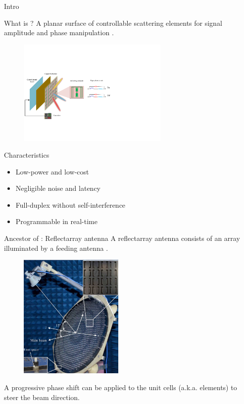 \documentclass[presentation,xcolor={table},9pt]{beamer}
\begin{document}
\begin{section}{Intro}
	\begin{frame}{What is ?}
		A planar surface of controllable scattering elements for signal amplitude and phase manipulation \cite{Wu2020}.
		\begin{figure}
			\centering
			\includegraphics[width=0.65\textwidth]{../assets/viva/ris_architecture.pdf}
			\label{fg:ris_architecture}
		\end{figure}
		\begin{block}{Characteristics}
			\begin{itemize}
				\item Low-power and low-cost
				\item Negligible noise and latency
				\item Full-duplex without self-interference
				\item Programmable in real-time
			\end{itemize}
		\end{block}
	\end{frame}

	\begin{frame}{Ancestor of : Reflectarray antenna}
		A reflectarray antenna consists of an array illuminated by a feeding antenna \cite{Deng2016}.
		\begin{figure}
			\centering
			\includegraphics[width=0.45\textwidth]{../assets/viva/reflectarray.png}
		\end{figure}
		A progressive phase shift can be applied to the unit cells (a.k.a. elements) to steer the beam direction.
	\end{frame}


\end{section}
\end{document}
